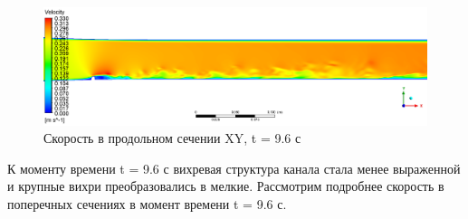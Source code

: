 	\begin{figure}[H]
		\centering
		\includegraphics[width=1\linewidth]{../Assets/T96_Velocity_ContourXY}
		\caption{Скорость в продольном сечении XY, t = 9.6 с}
		\label{fig:t96velocitycontourxy}
	\end{figure}
	К моменту времени t = 9.6 с вихревая структура канала стала менее выраженной и крупные вихри преобразовались в мелкие. 
	Рассмотрим подробнее скорость в поперечных сечениях в момент времени t = 9.6 с.

